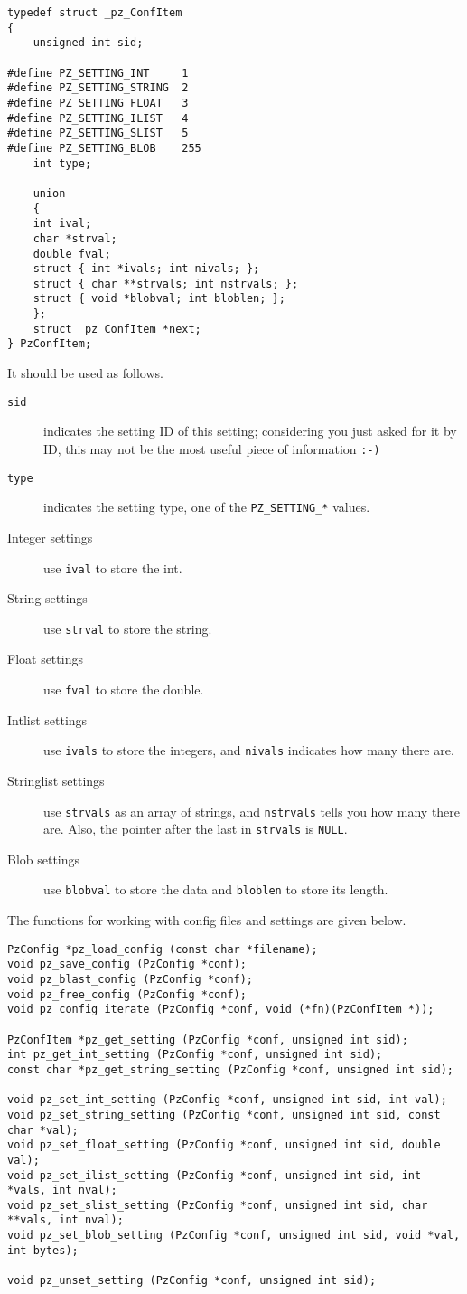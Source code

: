\documentclass[12pt,letterpaper]{report}
\let\ttt\tt
\def\tt{\def\_{{\ttt\char`\_}}\ttt}
\begin{document}
\begin{verbatim}
typedef struct _pz_ConfItem 
{
    unsigned int sid;

#define PZ_SETTING_INT     1
#define PZ_SETTING_STRING  2
#define PZ_SETTING_FLOAT   3
#define PZ_SETTING_ILIST   4
#define PZ_SETTING_SLIST   5
#define PZ_SETTING_BLOB    255
    int type;

    union 
    {
	int ival;
	char *strval;
	double fval;
	struct { int *ivals; int nivals; };
	struct { char **strvals; int nstrvals; };
	struct { void *blobval; int bloblen; };
    };
    struct _pz_ConfItem *next;
} PzConfItem;
\end{verbatim}
It should be used as follows.
\begin{description}
\item[{\tt sid}] indicates the setting ID of this setting; considering you just asked for it
by ID, this may not be the most useful piece of information {\tt :-)}
\item[{\tt type}] indicates the setting type, one of the \verb|PZ_SETTING_*| values.
\item[Integer settings] use \verb|ival| to store the int.
\item[String settings] use \verb|strval| to store the string.
\item[Float settings] use \verb|fval| to store the double.
\item[Intlist settings] use \verb|ivals| to store the integers, and \verb|nivals| indicates how
many there are.
\item[Stringlist settings] use \verb|strvals| as an array of strings, and \verb|nstrvals| tells you
how many there are. Also, the pointer after the last in \verb|strvals| is \verb|NULL|.
\item[Blob settings] use \verb|blobval| to store the data and \verb|bloblen| to store its length.
\end{description}

The functions for working with config files and settings are given below.

{\footnotesize\begin{verbatim}
PzConfig *pz_load_config (const char *filename);
void pz_save_config (PzConfig *conf);
void pz_blast_config (PzConfig *conf);
void pz_free_config (PzConfig *conf);
void pz_config_iterate (PzConfig *conf, void (*fn)(PzConfItem *));

PzConfItem *pz_get_setting (PzConfig *conf, unsigned int sid);
int pz_get_int_setting (PzConfig *conf, unsigned int sid);
const char *pz_get_string_setting (PzConfig *conf, unsigned int sid);

void pz_set_int_setting (PzConfig *conf, unsigned int sid, int val);
void pz_set_string_setting (PzConfig *conf, unsigned int sid, const char *val);
void pz_set_float_setting (PzConfig *conf, unsigned int sid, double val);
void pz_set_ilist_setting (PzConfig *conf, unsigned int sid, int *vals, int nval);
void pz_set_slist_setting (PzConfig *conf, unsigned int sid, char **vals, int nval);
void pz_set_blob_setting (PzConfig *conf, unsigned int sid, void *val, int bytes);

void pz_unset_setting (PzConfig *conf, unsigned int sid);
\end{verbatim}
}
\end{document}
